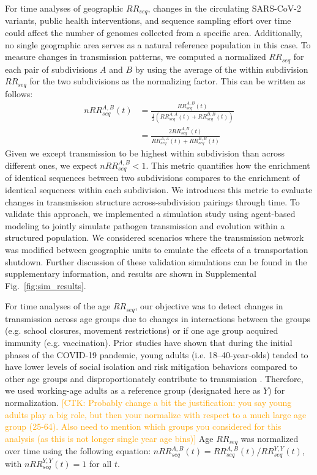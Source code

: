 \documentclass[11pt, letterpaper, oneside]{article}
\def\ctkc#1{\textcolor{orange}{[CTK: #1]}}
\begin{document}
For time analyses of geographic $RR_{seq}$, changes in the circulating SARS-CoV-2 variants, public health interventions, and sequence sampling effort over time could affect the number of genomes collected from a specific area.
Additionally, no single geographic area serves as a natural reference population in this case.
To measure changes in transmission patterns, we computed a normalized $RR_{seq}$ for each pair of subdivisions $A$ and $B$ by using the average of the within subdivision $RR_{seq}$ for the two subdivisions as the normalizing factor.
This can be written as follows:
\begin{align*}
nRR_{seq}^{A,B}(t) &= \frac{RR_{seq}^{A,B}(t)}{\frac{1}{2}(RR_{seq}^{A,A}(t)+RR_{seq}^{B,B}(t))} \\
             &= \frac{2 RR_{seq}^{A,B}(t)}{RR_{seq}^{A,A}(t)+RR_{seq}^{B,B}(t)}
\end{align*}
Given we except transmission to be highest within subdivision than across different ones, we expect $nRR_{seq}^{A,B} < 1$. 
This metric quantifies how the enrichment of identical sequences between two subdivisions compares to the enrichment of identical sequences within each subdivision.
We introduces this metric to evaluate changes in transmission structure across-subdivision pairings through time. 
To validate this approach, we implemented a simulation study using agent-based modeling to jointly simulate pathogen transmission and evolution within a structured population.
We considered scenarios where the transmission network was modified between geographic units to emulate the effects of a transportation shutdown.
Further discussion of these validation simulations can be found in the supplementary information, and results are shown in Supplemental Fig.\ \ref{fig:sim_results}.

For time analyses of the age $RR_{seq}$, our objective was to detect changes in transmission across age groups due to changes in interactions between the groups (e.g. school closures, movement restrictions) or if one age group acquired immunity (e.g. vaccination).
Prior studies have shown that during the initial phases of the COVID-19 pandemic, young adults (i.e. 18--40-year-olds) tended to have lower levels of social isolation and risk mitigation behaviors compared to other age groups \autocite{kimHowDoesAge2020,helenaj.hutchinsCOVID19MitigationBehaviors2020,engeliSocialContactPatterns} and disproportionately contribute to transmission \autocite{monodAgeGroupsThat2021,trankiemSARSCoV2TransmissionAge2021}.
Therefore, we used working-age adults as a reference group (designated here as $Y$) for normalization. 
\ctkc{Probably change a bit the justification: you say young adults play a big role, but then your normalize with respect to a much large age group (25-64).
 Also need to mention which groups you considered for this analysis (as this is not longer single year age bins)}
Age $RR_{seq}$ was normalized over time using the following equation: $nRR_{seq}^{A,B}(t) = RR_{seq}^{A,B}(t)/RR_{seq}^{Y,Y}(t)$, with $nRR_{seq}^{Y,Y}(t) = 1$ for all $t$.
\end{document}
